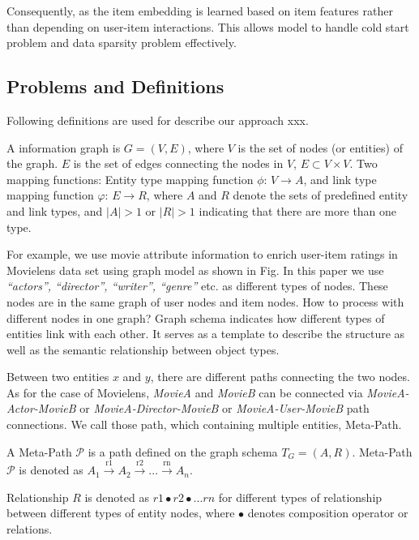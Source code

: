 Consequently, as the item embedding is learned based on item features rather than depending on user-item interactions. This allows model to handle cold start problem and data sparsity problem effectively. 

\subsection{Problems and Definitions}\label{3PD}
Following definitions are used for describe our approach xxx.

\begin{definition}
A information graph is $G = (V,E)$, where $V$ is the set of nodes (or entities) of the graph. $E$ is the set of edges connecting the nodes in $V$, $E \subset V \times V$. \newline
Two mapping functions: Entity type mapping function $\phi$: $V \rightarrow A$, and link type mapping function $\varphi$: $E \rightarrow R$, where $A$ and $R$ denote the sets of predefined entity and link types, and $|A| > 1$ or $|R| > 1$ indicating that there are more than one type.
\end{definition}

For example, we use movie attribute information to enrich user-item ratings in Movielens data set using graph model as shown in Fig. %
In this paper we use \textit{``actors'', ``director'', ``writer'', ``genre''} etc. as different types of nodes. These nodes are in the same graph of user nodes and item nodes. How to process with different nodes in one graph? Graph schema indicates how different types of entities link with each other. It serves as a template to describe the structure as well as the semantic relationship between object types.

Between two entities $x$ and $y$, there are different paths connecting the two nodes. As for the case of Movielens, \textit{MovieA} and \textit{MovieB} can be connected via \textit{MovieA-Actor-MovieB} or \textit{MovieA-Director-MovieB} or \textit{MovieA-User-MovieB} path connections. We call those path, which containing multiple entities, Meta-Path.

\begin{definition}\label{def:metaPath}
A Meta-Path $\mathcal{P}$ is a path defined on the  graph schema $T_G = (A, R)$. \newline
Meta-Path $\mathcal{P}$ is denoted as $A_1 \xrightarrow{\text{r1}} A_2 \xrightarrow{\text{r2}} ... \xrightarrow{\text{rn}} A_n$. 

Relationship $R$ is denoted as $r1 \bullet r2 \bullet ... rn$ for different types of relationship between different types of entity nodes, where $\bullet $ denotes composition operator or relations.
\end{definition}

